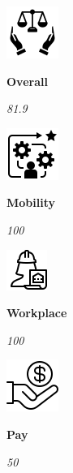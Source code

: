 \documentclass[
]{article}
\begin{document}
\begin{minipage}[c][3.5cm][t]{2.1cm}\begin{mybox}\centering
\vspace{.3cm}
\includegraphics[height=.75cm]{overall.png}

\vspace{.3cm}
\fontsize{7.5}{1}\selectfont   
\textbf{Overall}\normalsize 

\vspace{20pt}
\fontsize{14}{1}\selectfont 
\emph{81.9}
\vspace{.3cm}
\normalsize\end{mybox}\end{minipage}
\begin{minipage}[c][3.5cm][t]{2.1cm}\begin{mybox}\centering
\vspace{.3cm}
\includegraphics[height=.75cm]{mobility.png}

\vspace{.3cm}
\fontsize{7.5}{1}\selectfont   
\textbf{Mobility}\normalsize 

\vspace{20pt}
\fontsize{14}{1}\selectfont 
\emph{100}
\vspace{.3cm}
\normalsize\end{mybox}\end{minipage}
\begin{minipage}[c][3.5cm][t]{2.1cm}\begin{mybox}\centering
\vspace{.3cm}
\includegraphics[height=.75cm]{workplace.png}

\vspace{.3cm}
\fontsize{7.5}{1}\selectfont   
\textbf{Workplace}\normalsize 

\vspace{20pt}
\fontsize{14}{1}\selectfont 
\emph{100}
\vspace{.3cm}
\normalsize\end{mybox}\end{minipage}
\begin{minipage}[c][3.5cm][t]{2.1cm}\begin{mybox}\centering
\vspace{.3cm}
\includegraphics[height=.75cm]{pay.png}

\vspace{.3cm}
\fontsize{7.5}{1}\selectfont   
\textbf{Pay}\normalsize 

\vspace{20pt}
\fontsize{14}{1}\selectfont 
\emph{50}
\vspace{.3cm}
\normalsize\end{mybox}\end{minipage}
\end{document}
